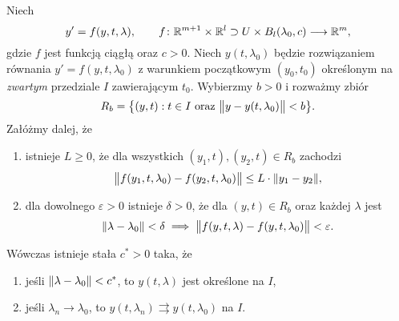 %
\begin{theorem} \label{T: CZoP}
  Niech
%
  \begin{equation*}
    y' = f(y,t,\lambda), \qquad f \colon \R^{m+1} \times \R^l \supset U \times B_l(\lambda_0,c) \longrightarrow \R^m,
  \end{equation*}
%
  gdzie $f$ jest funkcją ciągłą oraz $c>0$. Niech $y(t,\lambda_0)$ będzie rozwiązaniem równania $y' = f(y,t,\lambda_0)$ 
  z warunkiem początkowym $(y_0,t_0)$ określonym na \emph{zwartym} przedziale $I$ zawierającym $t_0$. Wybierzmy $b > 0$ 
  i rozważmy zbiór
%
  \begin{equation*}
    R_b = \big\{ (y,t) : t \in I \text{ oraz } \norm[\big]{ y - y(t,\lambda_0) } < b \big\}.
  \end{equation*}
%
  Załóżmy dalej, że
%
  \begin{enumerate}[label=\alph*)]
    \item istnieje $L \geq 0$, że dla wszystkich $(y_1,t),(y_2,t) \in R_b$ zachodzi
%
    \begin{equation*}
      \norm[\big]{ f(y_1,t,\lambda_0) - f(y_2,t,\lambda_0) } \leq L \cdot \norm{y_1-y_2},
    \end{equation*}
%
    \item dla dowolnego $\varepsilon>0$ istnieje $\delta>0$, że dla $(y,t) \in R_b$ oraz każdej $\lambda$ jest
%
    \begin{equation*}
      \norm{\lambda - \lambda_0} < \delta \implies \norm[\big]{ f(y,t,\lambda) - f(y,t,\lambda_0) } < \varepsilon.
    \end{equation*}
%
  \end{enumerate}
%
  Wówczas istnieje stała $c^{\ast} > 0$ taka, że
%
  \begin{enumerate}
    \item jeśli $\norm{\lambda-\lambda_0} < c^{\ast}$, to $y(t,\lambda)$ jest określone na $I$,
    \item jeśli $\lambda_n \to \lambda_0$, to $y(t,\lambda_n) \rightrightarrows y(t,\lambda_0)$ na $I$.
  \end{enumerate}
%
\end{theorem}
%
